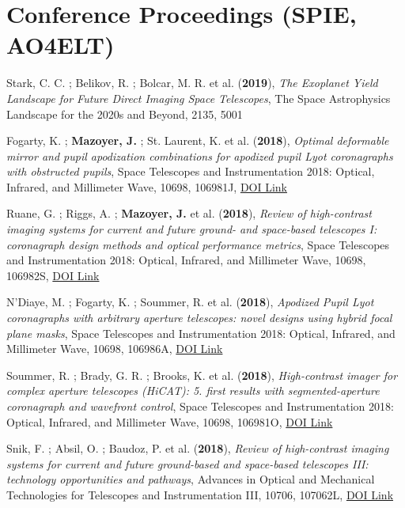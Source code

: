 \documentclass[11pt]{article}
\begin{document}
\section*{Conference Proceedings (SPIE, AO4ELT)}

\begin{etaremune} \itemsep 0pt


\item Stark, C. C. ; Belikov, R. ; Bolcar, M. R. et al. ({\bf2019}), {\it The Exoplanet Yield Landscape for Future Direct Imaging Space Telescopes}, The Space Astrophysics Landscape for the 2020s and Beyond, 2135, 5001

\item Fogarty, K. ; {\bf Mazoyer, J.} ; St. Laurent, K. et al. ({\bf2018}), {\it Optimal deformable mirror and pupil apodization combinations for apodized pupil Lyot coronagraphs with obstructed pupils}, Space Telescopes and Instrumentation 2018: Optical, Infrared, and Millimeter Wave, 10698, 106981J, \href{https://doi.org/10.1117/12.2314394}{DOI Link}

\item Ruane, G. ; Riggs, A. ; {\bf Mazoyer, J.} et al. ({\bf2018}), {\it Review of high-contrast imaging systems for current and future ground- and space-based telescopes I: coronagraph design methods and optical performance metrics}, Space Telescopes and Instrumentation 2018: Optical, Infrared, and Millimeter Wave, 10698, 106982S, \href{https://doi.org/10.1117/12.2312948}{DOI Link}

\item N'Diaye, M. ; Fogarty, K. ; Soummer, R. et al. ({\bf2018}), {\it Apodized Pupil Lyot coronagraphs with arbitrary aperture telescopes: novel designs using hybrid focal plane masks}, Space Telescopes and Instrumentation 2018: Optical, Infrared, and Millimeter Wave, 10698, 106986A, \href{https://doi.org/10.1117/12.2313225}{DOI Link}

\item Soummer, R. ; Brady, G. R. ; Brooks, K. et al. ({\bf2018}), {\it High-contrast imager for complex aperture telescopes (HiCAT): 5. first results with segmented-aperture coronagraph and wavefront control}, Space Telescopes and Instrumentation 2018: Optical, Infrared, and Millimeter Wave, 10698, 106981O, \href{https://doi.org/10.1117/12.2314110}{DOI Link}

\item Snik, F. ; Absil, O. ; Baudoz, P. et al. ({\bf2018}), {\it Review of high-contrast imaging systems for current and future ground-based and space-based telescopes III: technology opportunities and pathways}, Advances in Optical and Mechanical Technologies for Telescopes and Instrumentation III, 10706, 107062L, \href{https://doi.org/10.1117/12.2313957}{DOI Link}


\end{etaremune}
\end{document}
